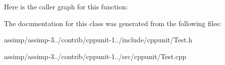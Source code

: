 Here is the caller graph for this function\+:




The documentation for this class was generated from the following files\+:\begin{DoxyCompactItemize}
\item 
assimp/assimp-\/3../contrib/cppunit-\/1../include/cppunit/Test.\+h\item 
assimp/assimp-\/3../contrib/cppunit-\/1../src/cppunit/Test.\+cpp\end{DoxyCompactItemize}

